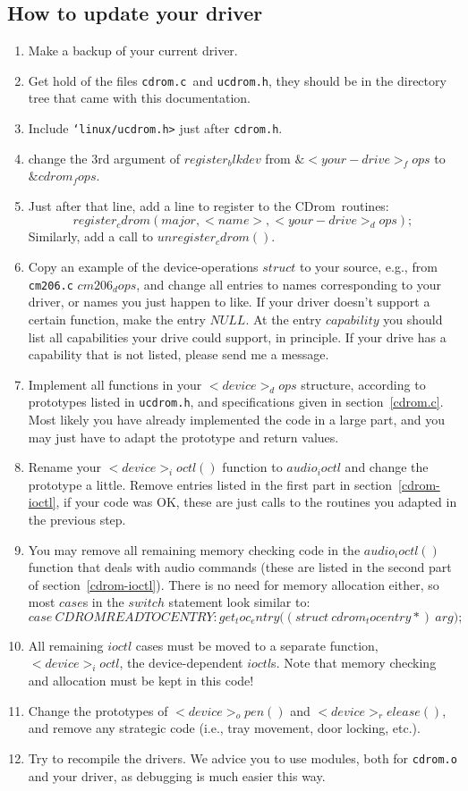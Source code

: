 \documentclass{article}
\def\cdrom{{\sc CDrom}}
\def\cdromc{{\tt cdrom.c}}
\def\ucdrom{{\tt ucdrom.h}}
\begin{document}
\subsection{How to update your driver}

\begin{enumerate}
\item Make a backup of your current driver. 
\item Get hold of the files \cdromc\ and \ucdrom, they should be in
the directory tree that came with this documentation. 
\item Include {\tt \char`\<linux/ucdrom.h>} just after {\tt cdrom.h}.
\item change the 3rd argument of $register_blkdev$ from
$\&<your-drive>_fops$ to $\&cdrom_fops$. 
\item Just after that line, add a line to register to the \cdrom\
routines: 
$$register_cdrom(major, <name>, <your-drive>_dops);$$
Similarly, add a call to $unregister_cdrom()$. 
\item Copy an example of the device-operations $struct$ to your source,
e.g., from {\tt cm206.c} $cm206_dops$, and change all entries to names
corresponding to your driver, or names you just happen to like. If
your driver doesn't support a certain function, make the entry
$NULL$. At the entry $capability$ you should list all capabilities
your drive could support, in principle. If your drive has a capability
that is not listed, please send me a message.
\item Implement all functions in your $<device>_dops$ structure,
according to prototypes listed in \ucdrom, and specifications given in
section~\ref{cdrom.c}. Most likely you have already implemented
the code in a large part, and you may just have to adapt the prototype
and return values. 
\item Rename your $<device>_ioctl()$ function to $audio_ioctl$ and
change the prototype a little. Remove entries listed in the first part
in section~\ref{cdrom-ioctl}, if your code was OK, these are just calls
to the routines you adapted in the previous step. 
\item You may remove all remaining memory checking code in the
$audio_ioctl()$ function that deals with audio commands (these are
listed in the second part of section~\ref{cdrom-ioctl}). There is no
need for memory allocation either, so most $case$s in the $switch$
statement look similar to:
$$
case\ CDROMREADTOCENTRY\colon
get_toc_entry\bigl((struct\ cdrom_tocentry *{})\ arg\bigr);
$$
\item All remaining $ioctl$ cases must be moved to a separate
function, $<device>_ioctl$, the device-dependent $ioctl$s. Note that
memory checking and allocation must be kept in this code!
\item Change the prototypes of $<device>_open()$ and
$<device>_release()$, and remove any strategic code (i.e., tray
movement, door locking, etc.). 
\item Try to recompile the drivers. We advice you to use modules, both
for {\tt cdrom.o} and your driver, as debugging is much easier this
way.
\end{enumerate} 
\end{document}
